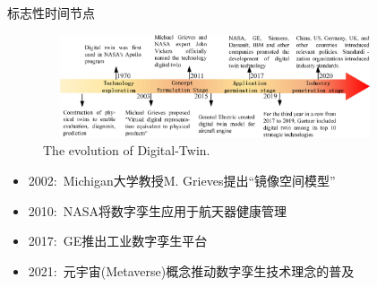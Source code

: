 \begin{frame}{标志性时间节点}
\begin{figure}[h!]
\centering
     \includegraphics[height=1.2in, width=4.0in, viewport=0 0 1416 471,clip]{Figures/Evolution_of_Digital-Twin.png}
\caption{\tiny \textrm{The evolution of Digital-Twin.}}%
\label{Fig:Evolution_of_Digital-Twin}
\end{figure}

  \begin{itemize}
	  \item \textrm{2002:~Michigan}大学教授\textrm{M. Grieves}提出``镜像空间模型''
	  \item \textrm{2010:~NASA}将数字孪生应用于航天器健康管理
	  \item \textrm{2017:~GE}推出工业数字孪生平台
	  \item \textrm{2021:~}元宇宙\textrm{(Metaverse)}概念推动数字孪生技术理念的普及
  \end{itemize}
\end{frame}

